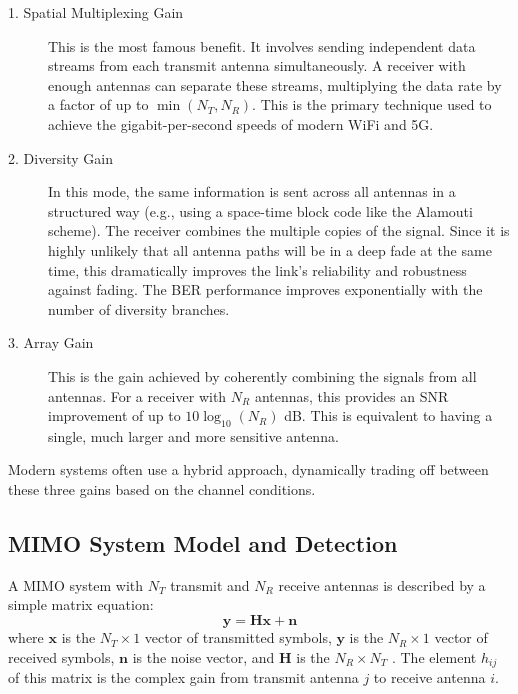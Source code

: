 \begin{description}
    \item[1. Spatial Multiplexing Gain] This is the most famous benefit. It involves sending independent data streams from each transmit antenna simultaneously. A receiver with enough antennas can separate these streams, multiplying the data rate by a factor of up to $\min(N_T, N_R)$. This is the primary technique used to achieve the gigabit-per-second speeds of modern WiFi and 5G.
    
    \item[2. Diversity Gain] In this mode, the same information is sent across all antennas in a structured way (e.g., using a space-time block code like the Alamouti scheme). The receiver combines the multiple copies of the signal. Since it is highly unlikely that all antenna paths will be in a deep fade at the same time, this dramatically improves the link's reliability and robustness against fading. The BER performance improves exponentially with the number of diversity branches.
    
    \item[3. Array Gain] This is the gain achieved by coherently combining the signals from all antennas. For a receiver with $N_R$ antennas, this provides an SNR improvement of up to $10\log_{10}(N_R)$ dB. This is equivalent to having a single, much larger and more sensitive antenna.
\end{description}
Modern systems often use a hybrid approach, dynamically trading off between these three gains based on the channel conditions.


\subsection{MIMO System Model and Detection}

A MIMO system with $N_T$ transmit and $N_R$ receive antennas is described by a simple matrix equation:
\begin{equation}
    \mathbf{y} = \mathbf{H}\mathbf{x} + \mathbf{n}
\end{equation}
where $\mathbf{x}$ is the $N_T \times 1$ vector of transmitted symbols, $\mathbf{y}$ is the $N_R \times 1$ vector of received symbols, $\mathbf{n}$ is the noise vector, and $\mathbf{H}$ is the $N_R \times N_T$ . The element $h_{ij}$ of this matrix is the complex gain from transmit antenna $j$ to receive antenna $i$.

